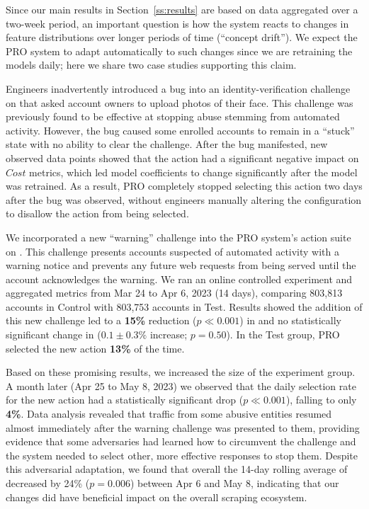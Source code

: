 Since our main results in Section~\ref{ss:results} are based on data aggregated over a two-week period, an important question is how the system reacts to changes in feature distributions over longer periods of time (``concept drift''). We expect the PRO system to adapt automatically to such changes since we are retraining the models daily; here we share two case studies supporting this claim.

 Engineers inadvertently introduced a bug into an identity-verification challenge on \ig that asked account owners to upload photos of their face. This challenge was previously found to be effective at stopping abuse stemming from automated activity. However, the bug caused some enrolled accounts to remain in a ``stuck'' state with no ability to clear the challenge. After the bug manifested, new observed data points showed that the action had a significant negative impact on $Cost$ metrics, which led model coefficients to change significantly after the model was retrained. As a result, PRO completely stopped selecting this action two days after the bug was observed, without engineers manually altering the configuration to disallow the action from being selected.

 We incorporated a new ``warning'' challenge into the PRO system's action suite on \ig. This challenge presents accounts suspected of automated activity with a warning notice and prevents any future web requests from being served until the account acknowledges the warning. We ran an online controlled experiment and aggregated metrics from Mar 24 to Apr 6, 2023 (14 days), comparing 803,813 accounts in Control with 803,753 accounts in Test. Results showed the addition of this new challenge led to a \textbf{15\%} reduction ($p \ll 0.001$) in \scraping and no statistically significant change in \timespent ($0.1 \pm 0.3\%$ increase; $p=0.50$). In the Test group, PRO selected the new action \textbf{13\%} of the time.

Based on these promising results, we increased the size of the experiment group. A month later (Apr 25 to May 8, 2023) we observed that the daily selection rate for the new action had a statistically significant drop ($p \ll 0.001$), falling to only \textbf{4\%}. Data analysis revealed that traffic from some abusive entities resumed almost immediately after the warning challenge was presented to them, providing evidence that some adversaries had learned how to circumvent the challenge and the system needed to select other, more effective responses to stop them. Despite this adversarial adaptation, we found that overall the 14-day rolling average of \scraping decreased by 24\% ($p = 0.006$) between Apr 6 and May 8, indicating that our changes did have beneficial impact on the overall scraping ecosystem.
